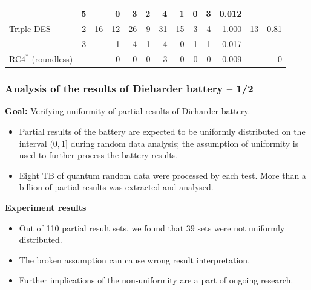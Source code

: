 \documentclass[aspectratio=169]{beamer}
\newcommand{\rd}{\cellcolor{red!40}}
\newcommand{\cone}{\cellcolor{lvl1!90}}
\newcommand{\cfour}{\cellcolor{lvl4}}
\begin{document}
\begin{frame}
\begin{nomar}
{\begin{tabular}{@{}lrrrrrrrrrrrr@{}}
                                 &  5 &     &  0        &  3     &  2       &  4    \rd &  1     & 0     & 3 \rd & 0.012     &    &              \\ \midrule
Triple DES                       &  2 &  16 & 12    \rd & 26 \rd &  9 \rd   & 31    \rd & 15 \rd & 3 \rd & 4 \rd & 1.000 \rd & 13 & 0.81 \cone   \\
                                 &  3 &     &  1        &  4 \rd &  1       &  4    \rd &  0     & 1     & 1     & 0.017     &    &              \\ \midrule
RC$\text{4}^{\ast}$  (roundless) & -- & --  &  0        &  0     &  0       &  3        &  0     & 0     & 0     & 0.009     & -- & 0    \cfour  \\
\end{tabular}
}

\end{nomar}
\end{frame}

\begin{frame}
\frametitle{Analysis of the results of Dieharder battery -- 1/2}
\textbf{Goal:} Verifying uniformity of partial results of Dieharder battery.

\begin{itemize}
\item Partial results of the battery are expected to be uniformly distributed on the interval $(0,1]$ during random data analysis; the assumption of uniformity is used to further process the battery results.
\item Eight TB of quantum random data were processed by each test. More than a billion of partial results was extracted and analysed.
\end{itemize}
\textbf{Experiment results}
\begin{itemize}
\item Out of 110 partial result sets, we found that 39 sets were not uniformly distributed.
\item The broken assumption can cause wrong result interpretation.
\item Further implications of the non-uniformity are a part of ongoing research.
\end{itemize}
\end{frame}
\end{document}
